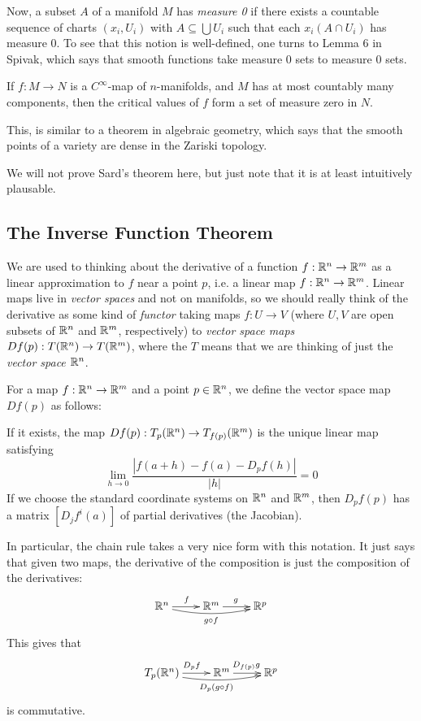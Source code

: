 \documentclass[11pt, english]{article}
\begin{document}
Now, a subset $A$  of a manifold $M$ has \emph{measure 0} if there exists a countable sequence of charts $(x_i, U_i)$  with $A \subseteq \bigcup U_i$ such that each $x_i(A \cap U_i)$ has measure $0$. To see that this notion is well-defined, one turns to Lemma 6 in Spivak, which says that smooth functions take measure 0 sets to measure 0 sets.

\begin{thm}
If $f:M \to N$ is a $C^\infty$-map of $n$-manifolds, and $M$ has at most countably many components, then the critical values of $f$ form a set of measure zero in $N$.
\end{thm}

This, is similar to a theorem in algebraic geometry, which says that the smooth points of a variety are dense in the Zariski topology.

We will not prove Sard's theorem here, but just note that it is at least intuitively plausable.


\subsection{The Inverse Function Theorem}

We are used to thinking about the derivative of a function $f:\mathbb{R}^n \to \mathbb{R}^m$ as a linear approximation to $f$ near a point $p$, i.e. a linear map $f:\mathbb{R}^n \to \mathbb{R}^m$. Linear maps live in \emph{vector spaces} and not on manifolds, so we should really think of the derivative as some kind of \emph{functor} taking maps $f:U \to V$ (where $U,V$ are open subsets of $\mathbb{R}^n$ and $\mathbb{R}^m$, respectively) to \emph{vector space maps} $Df(p):T(\mathbb{R}^n) \to T(\mathbb{R}^m)$, where the $T$ means that we are thinking of just the \emph{vector space} $\mathbb{R}^n$.

For a map $f:\mathbb{R} ^n \to \mathbb{R}^m$ and a point $p \in \mathbb{R}^n$, we define the vector space map $Df(p)$ as follows:
\begin{defi}
If it exists, the map $Df(p):T_p(\mathbb{R}^n) \to T_{f(p)}(\mathbb{R}^m)$ is the unique linear map satisfying
\[
\lim_{h \to 0} \frac{|f(a+h)-f(a)-D_pf(h)|}{|h|} = 0
\]
If we choose the standard coordinate systems on $\mathbb{R}^n$ and $\mathbb{R}^m$, then $D_pf(p)$ has a matrix $\left[ D_j f^i (a) \right]$ of partial derivatives (the Jacobian).
\end{defi}

In particular, the chain rule takes a very nice form with this notation. It just says that given two maps, the derivative of the composition is just the composition of the derivatives:
\[
\xymatrix{
\R^n \ar[r]^f \ar@/_/[rr]_{g \circ f} & \R^m \ar[r]^g & \R^p
}
\]
This gives that
\[
\xymatrix{
T_p(\R^n) \ar[r]^{D_pf} \ar@/_/[rr]_{D_p(g \circ f)} & \R^m \ar[r]^{D_{f(p)}g} & \R^p
}
\]
is commutative.
\end{document}
